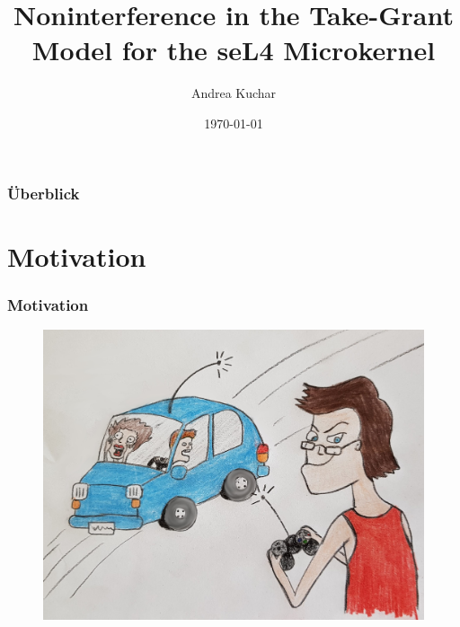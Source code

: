 \documentclass{beamer}
\title[Noninterference in Take-Grant for the seL4]{Noninterference in the Take-Grant Model for the seL4 Microkernel} %
\author{Andrea Kuchar} %
\institute[LMU] %
{
INSTITUT FÜR INFORMATIK \\
DER LUDWIG-MAXIMILIANS-UNIVERSITÄT MÜNCHEN \\
Lehr- und Forschungseinheit für theoretische Informatik \\ %
\medskip
}
\date{\today} %
\begin{document}
\begin{frame}
\titlepage %
\end{frame}

\begin{frame}
\frametitle{Überblick} %
\tableofcontents %
\end{frame}



\section{Motivation}
\begin{frame}
\frametitle{Motivation}
\begin{figure}[t]
\includegraphics[width=1\linewidth]{Auto.jpg}
\end{figure}
\end{frame}
\end{document}
